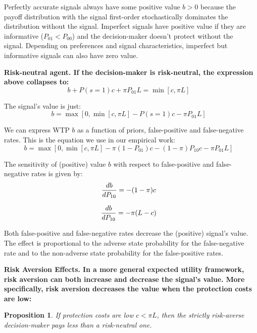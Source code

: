 \documentclass[12pt,a4paper]{article}
\newtheorem{theorem}{Proposition}
\begin{document}
Perfectly accurate signals always have some positive value $b>0$ because the payoff distribution with the signal first-order stochastically dominates the distribution without the signal. Imperfect signals have positive value if they are informative ($P_{01}<P_{00}$) and the decision-maker doesn't protect without the signal. Depending on preferences and signal characteristics, imperfect but informative signals can also have zero value. 

\vspace{10pt}
\bf Risk-neutral agent. \rm If the decision-maker is risk-neutral, the expression above collapses to:
$$b+P(s=1)c+\pi P_{01}L=\min[c,\pi L]$$

The signal's value is just:
\begin{equation}
b=\max[0,\min[c,\pi L]-P(s=1)c-\pi P_{01}L]
\end{equation}

We can express WTP $b$ as a function of priors, false-positive and false-negative rates. This is the equation we use in our empirical work:
\begin{equation}
b=\max[0,\min[c,\pi L]-\pi (1-P_{01})c-(1-\pi)P_{10}c-\pi P_{01}L]
\end{equation}

The sensitivity of (positive) value $b$ with respect to false-positive and false-negative rates is given by:
\begin{equation}
{db\over dP_{10}}=-(1-\pi)c
\end{equation}

\begin{equation}
{db\over dP_{10}}=-\pi(L-c)
\end{equation}
\vspace{10pt}

Both false-positive and false-negative rates decrease the (positive) signal's value. The effect is proportional to the adverse state probability for the false-negative rate and to the non-adverse state probability for the false-positive rates.

\vspace{10pt}
\bf Risk Aversion Effects. \rm In a more general expected utility framework, risk aversion can both increase and decrease the signal's value. More specifically, risk aversion decreases the value when the protection costs are low: 

\begin{theorem}
 If protection costs are low $c<\pi L$, then the strictly risk-averse decision-maker pays less than a risk-neutral one.
\end{theorem} 
\end{document}
